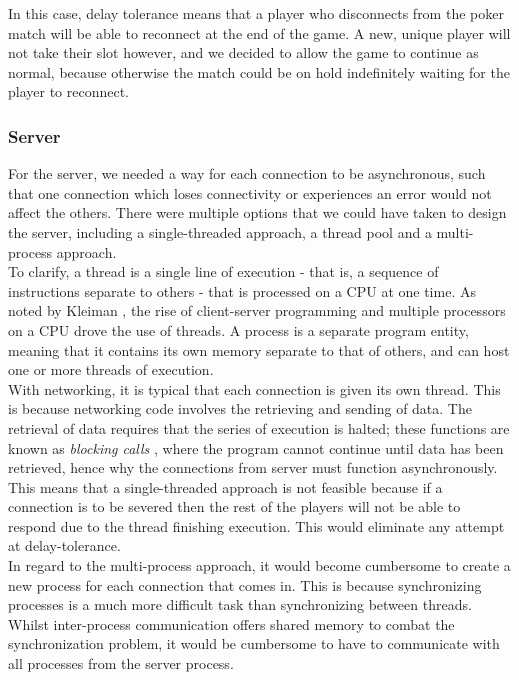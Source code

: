 \documentclass[11pt]{article}
\begin{document}
In this case, delay tolerance means that a player who disconnects from the poker match will be able to reconnect at the end of the game. A new, unique player will not take their slot however, and we decided to allow the game to continue as normal, because otherwise the match could be on hold indefinitely waiting for the player to reconnect.

\newpage
\subsubsection{Server}
For the server, we needed a way for each connection to be asynchronous, such that one connection which loses connectivity or experiences an error would not affect the others. There were multiple options that we could have taken to design the server, including a single-threaded approach, a thread pool and a multi-process approach. \\

To clarify, a thread is a single line of execution - that is, a sequence of instructions separate to others - that is processed on a CPU at one time. As noted by Kleiman \cite{client_server}, the rise of client-server programming and multiple processors on a CPU drove the use of threads. A process is a separate program entity, meaning that it contains its own memory separate to that of others, and can host one or more threads of execution. \\

With networking, it is typical that each connection is given its own thread. This is because networking code involves the retrieving and sending of data. The retrieval of data requires that the series of execution is halted; these functions are known as \textit{blocking calls} \cite{blocking_calls}, where the program cannot continue until data has been retrieved, hence why the connections from server must function asynchronously.  \\

This means that a single-threaded approach is not feasible because if a connection is to be severed then the rest of the players will not be able to respond due to the thread finishing execution. This would eliminate any attempt at delay-tolerance. \\

In regard to the multi-process approach, it would become cumbersome to create a new process for each connection that comes in. This is because synchronizing processes is a much more difficult task than synchronizing between threads. Whilst inter-process communication offers shared memory \citep{shared_memory} to combat the synchronization problem, it would be cumbersome to have to communicate with all processes from the server process.\\
\end{document}
